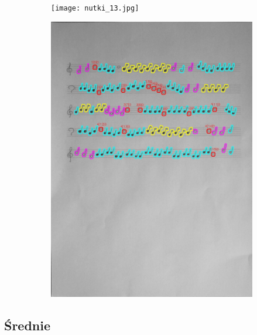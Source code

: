 \documentclass[11pt]{article}
\begin{document}
\begin{figure}[H]
    \centering
    \begin{subfigure}{.5\textwidth}
        \centering
        \graphicspath{ {Resources/} }
        \texttt{[image: nutki\_13.jpg]}
        \label{fig:sub1}
    \end{subfigure}%
    \begin{subfigure}{.5\textwidth}
        \centering
        \graphicspath{ {blobs/} }
        \includegraphics[width=\linewidth]{13_cnts.jpg}
        \label{fig:sub2}
    \end{subfigure}
    \label{fig:test}
\end{figure}

\subsection{Średnie}
\end{document}

